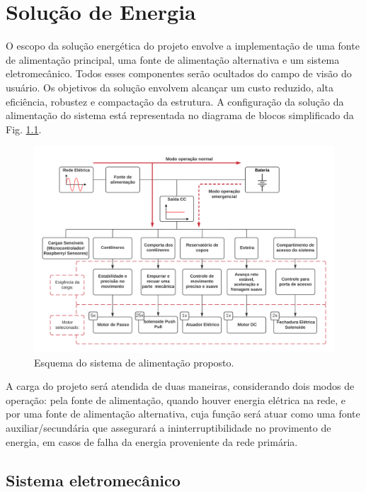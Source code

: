 \chapter[Solução de Energia]{Solução de Energia}
\label{Solução_energia}


O escopo da solução energética do projeto envolve a implementação de uma fonte de alimentação principal, uma fonte de alimentação alternativa e um sistema eletromecânico. Todos esses componentes serão ocultados do campo de visão do usuário. Os objetivos da solução envolvem alcançar um custo reduzido, alta eficiência, robustez e compactação da estrutura. A configuração da solução da alimentação do sistema está representada no diagrama de blocos simplificado da Fig. \ref{fig:energia_alimentacao}.

\begin{figure}[H]
    \centering
    \includegraphics[width=1\textwidth]{figuras/energia/esq_alimentacao.png}
    \caption{Esquema do sistema de alimentação proposto.}
    \label{fig:energia_alimentacao}
\end{figure}

A carga do projeto será atendida de duas maneiras, considerando dois modos de operação: pela fonte de alimentação, quando houver energia elétrica na rede, e por uma fonte de alimentação alternativa, cuja função será atuar como uma fonte auxiliar/secundária que assegurará a ininterruptibilidade no provimento de energia, em casos de falha da energia proveniente da rede primária.

\section{Sistema eletromecânico}

